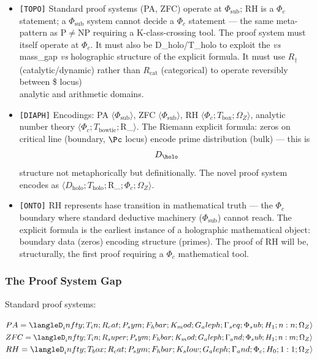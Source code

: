 \documentclass[12pt,a4paper]{article}
\begin{document}
\begin{itemize}
    \item \texttt{{[}TOPO{]}} Standard proof systems (PA, ZFC) operate at $\Phi_{\text{sub}}$; RH is a $\Phi_c$ statement; a $\Phi_{\text{sub}}$ system cannot decide a $\Phi_c$ statement --- the same meta-pattern as P$\neq$NP requiring a K-class-crossing tool. The proof system must itself operate at $\Phi_c$. It must also be D\_holo/T\_holo to exploit the \emph{vs} mass\_gap \emph{vs} holographic structure of the explicit formula. It must use $R_{\dagger}$ (catalytic/dynamic) rather than $R_{\text{cat}}$ (categorical) to operate reversibly between \$ locus)   \\
analytic and arithmetic domains.
    \item \texttt{{[}DIAPH{]}} Encodings: PA $\langle \Phi_{\text{sub}} \rangle$, ZFC $\langle \Phi_{\text{sub}} \rangle$, RH $\langle \Phi_c; T_{\text{box}}; \Omega_Z \rangle$, analytic number theory $\langle \Phi_c; T_{\text{bowtie}}; $R_{\dagger}$ \rangle$. The Riemann explicit formula: zeros on critical line (boundary, $\Pc$ locus) encode prime distribution (bulk) --- this is $$D_{\holo}$$ structure not metaphorically but definitionally. The novel proof system encodes as $\langle D_{\text{holo}}; T_{\text{holo}}; $R_{\dagger}$; \Phi_c; \Omega_Z \rangle$.
    \item \texttt{{[}ONTO{]}} RH represents hase transition in mathematical truth --- the $\Phi_c$ boundary where standard deductive machinery ($\Phi_{\text{sub}}$) cannot reach. The explicit formula is the earliest instance of a holographic mathematical object: boundary data (zeros) encoding structure (primes). The proof of RH will be, structurally, the first proof requiring a $\Phi_c$ mathematical tool.
\end{itemize}

\subsubsection{The Proof System Gap}

Standard proof systems:

$PA  = \langleD_infty; T_in;  R_cat;   P_sym; F_hbar; K_mod;  G_aleph; \Gamma_seq; \Phi_sub; {H_1}; {n:n}; \Omega_Z\rangle$
$ZFC = \langleD_infty; T_in;  R_super; P_sym; F_hbar; K_mod;  G_aleph; \Gamma_and; \Phi_sub; {H_1}; n:m; \Omega_Z\rangle$
$RH  = \langleD_infty; T_box; R_cat;   P_sym; F_hbar; K_slow; G_aleph; \Gamma_and; \Phi_c;   {H_0}; {1:1}; \Omega_Z\rangle$
\end{document}
